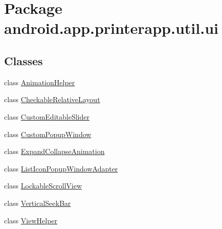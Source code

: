 \hypertarget{namespaceandroid_1_1app_1_1printerapp_1_1util_1_1ui}{}\section{Package android.\+app.\+printerapp.\+util.\+ui}
\label{namespaceandroid_1_1app_1_1printerapp_1_1util_1_1ui}
\subsection*{Classes}
\begin{DoxyCompactItemize}
\item 
class \hyperlink{classandroid_1_1app_1_1printerapp_1_1util_1_1ui_1_1_animation_helper}{Animation\+Helper}
\item 
class \hyperlink{classandroid_1_1app_1_1printerapp_1_1util_1_1ui_1_1_checkable_relative_layout}{Checkable\+Relative\+Layout}
\item 
class \hyperlink{classandroid_1_1app_1_1printerapp_1_1util_1_1ui_1_1_custom_editable_slider}{Custom\+Editable\+Slider}
\item 
class \hyperlink{classandroid_1_1app_1_1printerapp_1_1util_1_1ui_1_1_custom_popup_window}{Custom\+Popup\+Window}
\item 
class \hyperlink{classandroid_1_1app_1_1printerapp_1_1util_1_1ui_1_1_expand_collapse_animation}{Expand\+Collapse\+Animation}
\item 
class \hyperlink{classandroid_1_1app_1_1printerapp_1_1util_1_1ui_1_1_list_icon_popup_window_adapter}{List\+Icon\+Popup\+Window\+Adapter}
\item 
class \hyperlink{classandroid_1_1app_1_1printerapp_1_1util_1_1ui_1_1_lockable_scroll_view}{Lockable\+Scroll\+View}
\item 
class \hyperlink{classandroid_1_1app_1_1printerapp_1_1util_1_1ui_1_1_vertical_seek_bar}{Vertical\+Seek\+Bar}
\item 
class \hyperlink{classandroid_1_1app_1_1printerapp_1_1util_1_1ui_1_1_view_helper}{View\+Helper}
\end{DoxyCompactItemize}
